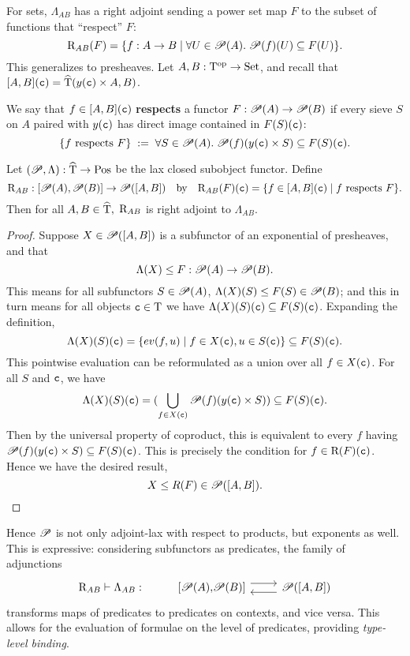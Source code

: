 \documentclass[stthol.tex]{subfiles}
\begin{document}
For sets, $\Lambda_{AB}$ has a right adjoint sending a power set map $F$ to the subset of functions that ``respect'' $F$:
$$\mathrm{R}_{AB}(F) = \{f:A\to B\; |\; \forall U\in \mathscr{P}(A).\; \mathscr{P}(f)(U)\subseteq F(U)\}.$$
This generalizes to presheaves. Let $A,B:\mathrm{T}^{\mathrm{op}}\to \mathrm{Set}$, and recall that $[A,B](\mathtt{c})= \widehat{\mathrm{T}}(y(\mathtt{c})\times A,B)$.

\begin{definition}
  We say that $f\in [A,B](\mathtt{c})$ \textbf{respects} a functor $F:\mathscr{P}(A)\to \mathscr{P}(B)$ if every sieve $S$ on $A$ paired with $y(\mathtt{c})$ has direct image contained in $F(S)(\mathtt{c})$:
  $$\{f \text{ respects } F\}\; :=\;\forall S\in \mathscr{P}(A).\; \mathscr{P}(f)(y(\mathtt{c})\times S)\subseteq F(S)(\mathtt{c}).$$
  \end{definition}

\begin{lemma}
\label{sec:lax}
Let $(\mathscr{P},\Lambda):\widehat{\mathrm{T}}\to \mathrm{Pos}$ be the lax closed subobject functor. Define
$$\mathrm{R}_{AB}:[\mathscr{P}(A),\mathscr{P}(B)]\to \mathscr{P}([A,B])\quad \text{by} \quad \mathrm{R}_{AB}(F)(\mathtt{c}) = \{f\in[A,B](\mathtt{c})\; |\; f \text{ respects } F\}.$$
Then for all $A,B\in \widehat{\mathrm{T}},$ $\mathrm{R}_{AB}$ is right adjoint to $\Lambda_{AB}$.
\end{lemma}

\begin{proof}
  Suppose $X\in \mathscr{P}([A,B])$ is a subfunctor of an exponential of presheaves, and that $${\Lambda(X)\leq F}:\mathscr{P}(A)\to \mathscr{P}(B).$$ This means for all subfunctors $S\in \mathscr{P}(A)$, $\Lambda(X)(S)\leq F(S)\in \mathscr{P}(B)$; and this in turn means for all objects $\mathtt{c}\in \mathrm{T}$ we have $\Lambda(X)(S)(\mathtt{c})\subseteq F(S)(\mathtt{c})$. Expanding the definition,
  $$\Lambda(X)(S)(\mathtt{c})=\{ev(f,u)\; |\; f\in X(\mathtt{c}), u\in S(\mathtt{c})\}\subseteq F(S)(\mathtt{c}).$$
  This pointwise evaluation can be reformulated as a union over all $f\in X(\mathtt{c})$. For all $S$ and $\mathtt{c}$, we have
  $$\Lambda(X)(S)(\mathtt{c})=(\bigcup_{f\in X(\mathtt{c})} \mathscr{P}(f)(y(\mathtt{c})\times S))\subseteq F(S)(\mathtt{c}).$$
  Then by the universal property of coproduct, this is equivalent to every $f$ having $\mathscr{P}(f)(y(\mathtt{c})\times S)\subseteq F(S)(\mathtt{c})$. This is precisely the condition for $f\in \mathrm{R}(F)(\mathtt{c})$. Hence we have the desired result,
  $$X\leq R(F)\in \mathscr{P}([A,B]).$$
  \vspace*{-\baselineskip}
\end{proof}

Hence $\mathscr{P}$ is not only adjoint-lax with respect to products, but exponents as well. This is expressive: considering subfunctors as predicates, the family of adjunctions
\[\begin{tikzcd}
    \mrm{R}_{AB} \vdash \Lambda_{AB}: & \left[\pow(A){,}\pow(B)\right] \arrow[r,yshift=0.4em] & \pow([A,B]) \arrow[l,yshift=-0.4em]
  \end{tikzcd}\]
transforms maps of predicates to predicates on contexts, and vice versa. This allows for the evaluation of formulae on the level of predicates, providing \textit{type-level binding}.
\end{document}
